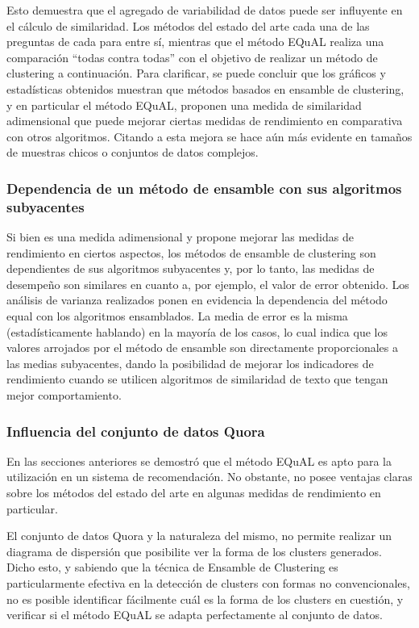 \bigskip Esto demuestra que el agregado de variabilidad de datos puede ser influyente en el cálculo de similaridad. Los métodos del estado del arte cada una de las preguntas de cada para entre sí, mientras que el método EQuAL realiza una comparación “todas contra todas” con el objetivo de realizar un método de clustering a continuación. Para clarificar, se puede concluir que los gráficos y estadísticas obtenidos muestran que métodos basados en ensamble de clustering, y en particular el método EQuAL,  proponen una medida de similaridad adimensional que puede mejorar ciertas medidas de rendimiento en comparativa con otros algoritmos. Citando a \cite{fred2005combining} esta mejora se hace aún más evidente en tamaños de muestras chicos o conjuntos de datos complejos.

\subsubsection{Dependencia de un método de ensamble con sus algoritmos subyacentes}
Si bien es una medida adimensional y propone mejorar las medidas de rendimiento en ciertos aspectos, los métodos de ensamble de clustering son dependientes de sus algoritmos subyacentes y, por lo tanto, las medidas de desempeño son similares en cuanto a, por ejemplo, el valor de error obtenido. Los análisis de varianza realizados ponen en evidencia la dependencia del método equal con los algoritmos ensamblados. La media de error es la misma (estadísticamente hablando) en la mayoría de los casos, lo cual indica que los valores arrojados por el método de ensamble son directamente proporcionales a las medias subyacentes, dando la posibilidad de mejorar los indicadores de rendimiento cuando se utilicen algoritmos de similaridad de texto que tengan mejor comportamiento.

\subsubsection{Influencia del conjunto de datos Quora}
En las secciones anteriores se demostró que el método EQuAL es apto para la utilización en un sistema de recomendación. No obstante, no posee ventajas claras sobre los métodos del estado del arte en algunas medidas de rendimiento en particular.

\bigskip El conjunto de datos Quora y la naturaleza del mismo, no permite realizar un diagrama de dispersión que posibilite ver la forma de los clusters generados. Dicho esto, y sabiendo que la técnica de Ensamble de Clustering es particularmente efectiva en la detección de clusters con formas no convencionales, no es posible identificar fácilmente cuál es la forma de los clusters en cuestión, y verificar si el método EQuAL se adapta perfectamente al conjunto de datos.


